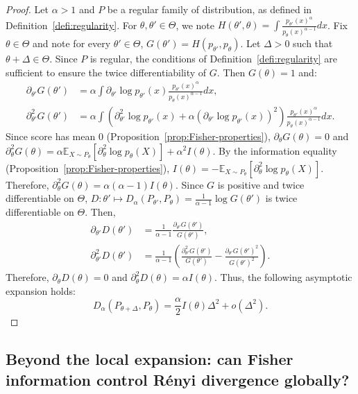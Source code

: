 \documentclass{article}
\theoremstyle{plain}
\theoremstyle{definition}
\theoremstyle{remark}
\begin{document}
\begin{proof}
    Let $\alpha > 1$ and $P$ be a regular family of distribution, as defined in Definition~\ref{defi:regularity}. For $\theta,\theta' \in \Theta$, we note $H(\theta',\theta) = \int \frac{p_{\theta'}(x)^\alpha}{p_{\theta}(x)^{\alpha-1}} dx$. Fix $\theta \in \Theta$ and note for every $\theta' \in \Theta$, $G(\theta') = H(p_{\theta'}, p_{\theta})$. Let $\Delta > 0$ such that $\theta + \Delta \in \Theta$. Since $P$ is regular, the conditions of Definition~\ref{defi:regularity} are sufficient to ensure the twice differentiability of $G$. Then $G(\theta) = 1$ and:
    \begin{align*}
        \partial_{\theta'} G(\theta') &= \alpha\int \partial_{\theta'} \log p_{\theta'} (x)\frac{p_{\theta'}(x)^\alpha}{p_{\theta}(x)^{\alpha-1}} dx,\\
        \partial_{\theta'}^2 G(\theta') &= \alpha \int (\partial_{\theta'}^2\log p_{\theta'}(x) + \alpha (\partial_{\theta'} \log p_{\theta'}(x))^2)\frac{p_{\theta'}(x)^\alpha}{p_{\theta}(x)^{\alpha-1}} dx.
    \end{align*}
    Since score has mean $0$ (Proposition~\ref{prop:Fisher-properties}), $\partial_{\theta} G(\theta) = 0$ and $\partial_{\theta}^2 G(\theta) = \alpha \mathbb{E}_{X \sim P_\theta}[\partial_\theta^2 \log p_\theta(X)] + \alpha^2 I(\theta)$. By the information equality (Proposition~\ref{prop:Fisher-properties}), $I(\theta) = -\mathbb{E}_{X \sim P_\theta}[\partial_\theta^2 \log p_\theta(X)]$. Therefore, $\partial_\theta^2 G(\theta) = \alpha (\alpha-1) I(\theta)$.
    Since $G$ is positive and twice differentiable on $\Theta$, $D : \theta' \mapsto D_\alpha(P_{\theta'}, P_\theta) = \frac{1}{\alpha-1} \log G(\theta')$ is twice differentiable on $\Theta$. Then,
    \begin{align*}
        \partial_{\theta'} D(\theta') &= \frac{1}{\alpha-1} \frac{\partial_{\theta'} G(\theta')}{G(\theta')},\\
        \partial_{\theta'}^2 D(\theta') &= \frac{1}{\alpha-1} \left(\frac{\partial_{\theta'}^2 G(\theta')}{G(\theta')} - \frac{\partial_{\theta'} G(\theta')^2}{G(\theta')^2}\right).
    \end{align*}
    Therefore, $\partial_\theta D(\theta) = 0$ and $\partial_\theta^2 D(\theta) = \alpha I(\theta)$.
    Thus, the following asymptotic expansion holds:
     \[D_\alpha(P_{\theta + \Delta},P_{\theta}) = \frac{\alpha}{2}I(\theta)\Delta^2 + o(\Delta^2).\]
\end{proof}

\subsection{Beyond the local expansion: can Fisher information control Rényi divergence globally?}
\label{app:fisher-global-counterexample}
\end{document}
